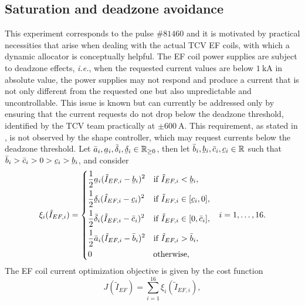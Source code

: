 \subsection{Saturation and deadzone avoidance}
\label{sec:shots_satdz}
This experiment corresponds to the pulse $\#81460$ and it is motivated by practical necessities that arise when dealing with the actual TCV EF coils, with which a dynamic allocator is conceptually helpful. The EF coil power supplies are subject to deadzone effects, \emph{i.e.}, when the requested current values are below $\SI{1}{\kilo\ampere}$ in absolute value, the power supplies may not respond and produce a current that is not only different from the requested one but also unpredictable and uncontrollable. This issue is known but can currently be addressed only by ensuring that the current requests do not drop below the deadzone threshold, identified by the TCV team practically at $\pm\SI{600}{\ampere}$. This requirement, as stated in , is not observed by the shape controller, which may request currents below the deadzone threshold. Let $\bar{a}_{i},\ubar{a}_{i},\bar{\delta}_{i},\ubar{\delta}_{i} \in \R_{\geq 0}$, then let $\bar{b}_{i},\ubar{b}_{i},\bar{c}_{i},\ubar{c}_{i}\in\R$ such that $\bar{b}_{i} > \bar{c}_{i} > 0 > \ubar{c}_{i} > \ubar{b}_{i}$, and consider
\begin{align}
  \label{eq:shots_satdz_xi}
  \xi_{i}(\tilde{I}_{EF,i}) &= \left\{
    \begin{aligned}
        &\frac{1}{2}\ubar{a}_{i} (\tilde{I}_{EF,i} - \ubar{b}_{i})^2 &\text{if } &\tilde{I}_{EF,i} < \ubar{b}_{i},\\
        &\frac{1}{2}\ubar{\delta}_{i} (\tilde{I}_{EF,i} - \ubar{c}_{i})^2 &\text{if } &\tilde{I}_{EF,i} \in [\ubar{c}_{i},0],\\
        &\frac{1}{2}\bar{\delta}_{i} (\tilde{I}_{EF,i} - \bar{c}_{i})^2 &\text{if } &\tilde{I}_{EF,i} \in [0,\bar{c}_{i}],\\
        &\frac{1}{2}\bar{a}_{i} (\tilde{I}_{EF,i} - \bar{b}_{i})^2 &\text{if } &\tilde{I}_{EF,i} > \bar{b}_{i},\\
        &0 &\, &\hspace{-9.5pt}\text{otherwise},
    \end{aligned}
  \right. & i=1,\dotsc,16.
\end{align}
The EF coil current optimization objective is given by the cost function
\begin{equation}
  \label{eq:shots_satdz_cost}
  J(\tilde{I}_{EF}) = \sum_{i=1}^{16} \xi_{i}(\tilde{I}_{EF,i}),
\end{equation}
